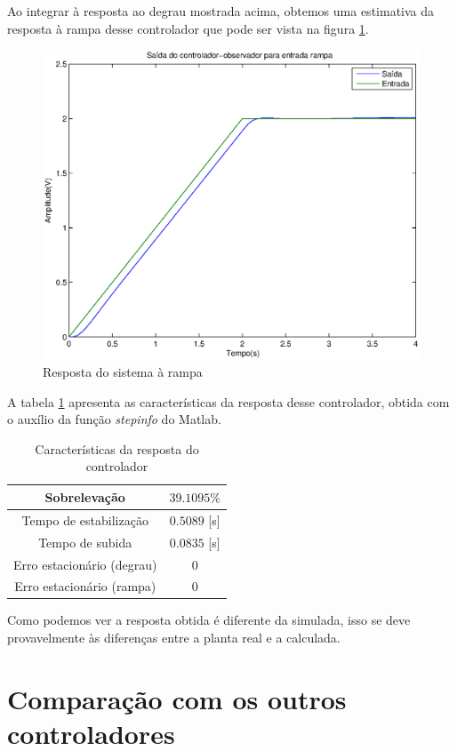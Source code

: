 \documentclass{article}
\begin{document}
Ao integrar à resposta ao degrau mostrada acima, obtemos uma estimativa da resposta à rampa desse controlador que pode ser vista na figura \ref{fig:yrSISR}.
\begin{figure}[H]
	\centering
	\includegraphics[width=0.8\linewidth]{../yrSISR}
	\caption{Resposta do sistema à rampa}
	\label{fig:yrSISR}
\end{figure}

A tabela \ref{tab:stepinfoSIS} apresenta as características da resposta desse controlador, obtida com o auxílio da função \textit{stepinfo} do Matlab.
\begin{table}[H]
	\centering
	\caption{Características da resposta do controlador}
	\label{tab:stepinfoSIS}
	\begin{tabular}{|c|c|}
		\hline Sobrelevação 				& $39.1095\%$ \\ 
		\hline Tempo de estabilização 		& $0.5089$ [s]\\ 
		\hline Tempo de subida				& $0.0835$ [s]\\ 
		\hline Erro estacionário (degrau) 	& $0$\\ 
		\hline Erro estacionário (rampa) 	& $0$\\ 
		\hline 
	\end{tabular} 
\end{table}
Como podemos ver a resposta obtida é diferente da simulada, isso se deve provavelmente às diferenças entre a planta real e a calculada. 

\section{Comparação com os outros controladores}
\end{document}

